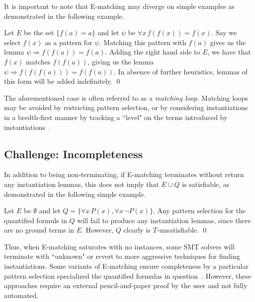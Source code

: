 \documentclass[oribibl]{llncs}
\begin{document}
It is important to note that E-matching may diverge on simple examples
as demonstrated in the following example.

\begin{example}
Let $E$ be the set $\{ f( a ) = a \}$ and let $\psi$ be $\forall x\, f( f( x ) ) = f( x )$.
Say we select $f( x )$ as a pattern for $\psi$.
Matching this pattern with $f( a )$ gives us the lemma $\psi \Rightarrow f( f( a ) ) = f( a )$.
Adding the right hand side to $E$, we have that $f( x )$ matches $f( f( a ) )$, giving us the lemma $\psi \Rightarrow f( f( f( a ) ) ) = f( f( a ) )$.
In absence of further heuristics, lemmas of this form will be added indefinitely.
\qed
\end{example}

The aforementioned case is often referred to as a \emph{matching loop}.
Matching loops may be avoided by
restricting pattern selection, or by
considering instantiations in a bredth-first manner by tracking a ``level" on the terms introduced by instantiations~\cite{}.

\subsection{Challenge: Incompleteness}

In addition to being non-terminating, if E-matching terminates without return any instantiation lemmas,
this does not imply that $E \cup Q$ is satisfiable, as demonstrated in the following simple example.

\begin{example}
Let $E$ be $\emptyset$ and let $Q = \{ \forall x\, P( x ), \forall x\, \neg P( x ) \}$.
Any pattern selection for the quantified formuls in $Q$ will fail to produce any instantiation lemmas,
since there are no ground terms in $E$.
However, $Q$ clearly is $T$-unsatisfiable.
\qed
\end{example}

Thus, when E-matching saturates with no instances, some SMT solvers will terminate with ``unknown"
or revert to more aggressive techniques for finding instantiations.
Some variants of E-matching ensure completeness by a particular pattern selection specialized the quantified formulas in question~\cite{}.
However, these approaches require an external pencil-and-paper proof by the user and not fully automated.

\end{document}
